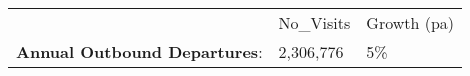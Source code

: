 \begin{tabular}[t]{p{5cm}p{1.3cm}p{1.2cm}}
   & No\_Visits & Growth (pa) \\ 
 \textbf{Annual Outbound Departures}: & 2,306,776 & 5\% \\ 
  \end{tabular}
